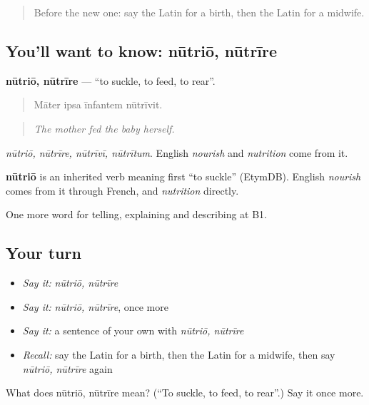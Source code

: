\begin{quote}
Before the new one: say the Latin for a birth, then the Latin for a midwife.
\end{quote}

\subsection*{You'll want to know: nūtriō, nūtrīre}
\textbf{nūtriō, nūtrīre} — \textquotedblleft{}to suckle, to feed, to rear\textquotedblright{}.

\begin{quote}
Māter ipsa īnfantem nūtrīvit.
\end{quote}

\begin{quote}
\emph{The mother fed the baby herself.}
\end{quote}

\emph{nūtriō, nūtrīre, nūtrīvī, nūtrītum}. English \emph{nourish} and \emph{nutrition} come from it.

\begin{cousinweb}
\textbf{nūtriō} is an inherited verb meaning first \textquotedblleft{}to suckle\textquotedblright{} (EtymDB). English \emph{nourish} comes from it through French, and \emph{nutrition} directly.
\end{cousinweb}

\begin{grammarlens}[title={What you've built}]
One more word for telling, explaining and describing at B1.
\end{grammarlens}

\subsection*{Your turn}
\begin{itemize}
\raggedright
  \item \emph{Say it:} \emph{nūtriō, nūtrīre}
  \item \emph{Say it:} \emph{nūtriō, nūtrīre}, once more
  \item \emph{Say it:} a sentence of your own with \emph{nūtriō, nūtrīre}
  \item \emph{Recall:} say the Latin for a birth, then the Latin for a midwife, then say \emph{nūtriō, nūtrīre} again
\end{itemize}

\begin{tcolorbox}[breakable,colback=teal!4,colframe=teal!35!black,title={Before you move on}]
What does nūtriō, nūtrīre mean? (\textquotedblleft{}To suckle, to feed, to rear\textquotedblright{}.) Say it once more.
\end{tcolorbox}

